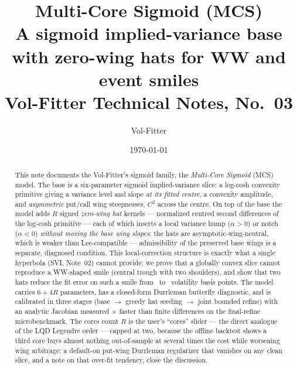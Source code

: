 \documentclass[11pt]{article}
\title{\textbf{Multi-Core Sigmoid (MCS)}\\[2pt]
\large A sigmoid implied-variance base with zero-wing hats for WW and event smiles\\[2pt]
\normalsize Vol-Fitter Technical Notes, No.~03}
\author{Vol-Fitter}
\date{\today}
\begin{document}
\maketitle


\providecommand{\sivtargetgmin}{--}
\providecommand{\sivfitgmin}{--}

\begin{abstract}
This note documents the Vol-Fitter's sigmoid family, the \emph{Multi-Core
Sigmoid} (MCS) model. The base is a six-parameter sigmoid implied-variance
slice: a log-cosh convexity primitive giving a variance level and slope
\emph{at its fitted centre}, a convexity amplitude, and \emph{asymmetric}
put/call wing steepnesses, $C^2$ across the centre. On top of the base the
model adds $R$ signed \emph{zero-wing hat} kernels --- normalized centred
second differences of the log-cosh primitive --- each of which inserts a local
variance hump ($\alpha>0$) or notch ($\alpha<0$) \emph{without moving the base
wing slopes}: the hats are asymptotic-wing-neutral, which is weaker than
Lee-compatible --- admissibility of the preserved base wings is a separate,
diagnosed condition. This local-correction structure is exactly what a single
hyperbola (SVI, Note~02) cannot provide: we prove that a globally convex slice
cannot reproduce a WW-shaped smile (central trough with two shoulders), and
show that two hats reduce the fit error on such a smile from \sivbasemaxerr\ to
\sivmaxerr\ volatility basis points. The model carries $6+4R$ parameters, has a
closed-form Durrleman butterfly diagnostic, and is calibrated in three stages
(base $\to$ greedy hat seeding $\to$ joint bounded refine) with an analytic
Jacobian measured \sivspeedup$\times$ faster than finite differences on the
final-refine microbenchmark. The cores count $R$ is the user's ``cores''
slider --- the direct analogue of the LQD Legendre order --- capped at two,
because the offline backtest shows a third core buys almost nothing
out-of-sample at several times the cost while worsening wing arbitrage; a
default-on put-wing Durrleman regularizer that vanishes on any clean slice,
and a note on that over-fit tendency, close the discussion.
\end{abstract}

\newpage
\tableofcontents
\newpage
\end{document}
